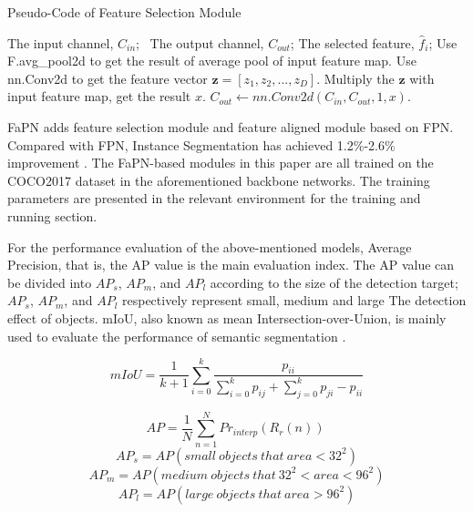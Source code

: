 \begin{algorithm}[htbp]
	\caption{Pseudo-Code of Feature Selection Module} 
	\label{alg2} 
	\begin{algorithmic}
		\REQUIRE 
        The input channel, $C_{in}$;
		\ The output channel, $C_{out}$;
		\ENSURE The selected feature, $\hat{f}_i$;
		\STATE Use F.avg\_pool2d to get the result of average pool of input feature map.
		\STATE Use nn.Conv2d to get the feature vector $\textbf{z} =  [z_1, z_2, ..., z_D]$.
		\STATE Multiply the $\textbf{z}$ with input feature map, get the result $x$.
		\STATE $C_{out} \gets nn.Conv2d(C_{in}, C_{out}, 1, x)$. 

	\end{algorithmic} 
\end{algorithm}


FaPN adds feature selection module \cite{hu2018squeeze} and feature aligned module based on FPN. Compared with FPN, Instance Segmentation has achieved 1.2\%-2.6\% improvement \cite{huang2021fapn}. The FaPN-based modules in this paper are all trained on the COCO2017 dataset in the aforementioned backbone networks. The training parameters are presented in the relevant environment for the training and running section.


For the performance evaluation of the above-mentioned models, Average Precision, that is, the AP value is the main evaluation index. The AP value can be divided into $AP_s$, $AP_m$, and $AP_l$ according to the size of the detection target; $AP_s$, $AP_m$, and $AP_l$ respectively represent small, medium and large The detection effect of objects. mIoU, also known as mean Intersection-over-Union, is mainly used to evaluate the performance of semantic segmentation \cite{padilla2021comparative}.

$$ mIoU = \frac{1}{k+1} \sum_{i=0}^{k}\frac{p_{ii}}{\sum_{i=0}^{k}p_{ij}+\sum_{j=0}^{k}p_{ji}-p_{ii}}$$

$$AP = \frac{1}{N}\sum_{n=1}^{N}Pr_{interp}(R_r(n))\ $$
$$AP_s = AP (small\ objects\ that\ area < 32^2)$$
$$AP_m = AP (medium\ objects\ that\ 32^2 < area < 96^2)$$
$$AP_l = AP (large\ objects\ that\ area > 96^2)$$

